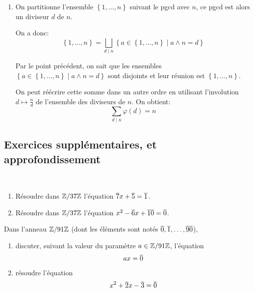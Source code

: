 {\begin{td-sol}[]
\begin{enumerate}
            \item On partitionne l'ensemble \(\left\{1,\dots,n\right\}\)
            suivant le pgcd avec \(n\), ce pgcd est alors un 
            diviseur \(d\) de \(n\).

            On a donc:
            \begin{equation*}
                \left\{1,\dots,n\right\} = \bigsqcup_{d\mid n}\left\{a\in\left\{1,\dots,n\right\}\mid a\wedge n=d\right\}
            \end{equation*}

            Par le point précédent, on sait que les ensembles
            \(\left\{a\in\left\{1,\dots,n\right\}\mid a\wedge n=d\right\}\)
            sont disjoints et leur réunion est \(\left\{1,\dots,n\right\}\).

            On peut réécrire cette somme dans un autre ordre en 
            utilisant l'involution \(d\mapsto \frac{n}{d}\) de 
            l'ensemble des diviseurs de \(n\). On obtient:
            \begin{equation*}
                \sum_{d\mid n}\varphi(d) = n
            \end{equation*}
        \end{enumerate}
    \end{td-sol}
}{}

\subsection*{Exercices supplémentaires, et approfondissement}

\begin{td-exo}[Equations]\, %
    \begin{enumerate}
        \item Résoudre dans \(\mathbb{Z}/37\mathbb{Z}\) l'équation \(\overline{7}x+ \overline{5}=\overline{1}\).
        \item Résoudre dans \(\mathbb{Z}/37\mathbb{Z}\) l'équation \(x^2- \overline{6}x+ \overline{10}=\overline{0}\).
    \end{enumerate}
\end{td-exo}

\begin{td-exo} %
    Dans l'anneau \(\mathbb{Z}/91\mathbb{Z}\) (dont les éléments sont notés \(\overline{0}, \overline{1}, \dots, \overline{90}\)), 
    \begin{enumerate}
        \item discuter, suivant la valeur du paramètre \(a\in\mathbb{Z}/91\mathbb{Z}\), l'équation
        \begin{equation*}
            ax=\overline{0}
        \end{equation*}
        
        \item résoudre l'équation
        \begin{equation*}
            x^2+\overline{2}x-\overline{3}=\overline{0}
        \end{equation*}
    \end{enumerate}
\end{td-exo}
